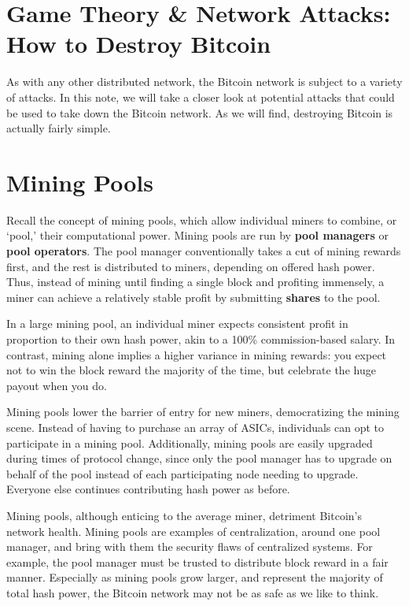\documentclass[full.tex]{subfiles}
\begin{document}
    \thispagestyle{firstpage}
    \vspace*{2\baselineskip}
    \section*{Game Theory \& Network Attacks: How to Destroy Bitcoin}
    
    As with any other distributed network, the Bitcoin network is subject to a variety of attacks. In this note, we will take a closer look at potential attacks that could be used to take down the Bitcoin network. As we will find, destroying Bitcoin is actually fairly simple.
    
    \section*{Mining Pools}
    
    Recall the concept of mining pools, which allow individual miners to combine, or `pool,' their computational power. Mining pools are run by \textbf{pool managers} or \textbf{pool operators}. The pool manager conventionally takes a cut of mining rewards first, and the rest is distributed to miners, depending on offered hash power. Thus, instead of mining until finding a single block and profiting immensely, a miner can achieve a relatively stable profit by submitting \textbf{shares} to the pool. 
    
    In a large mining pool, an individual miner expects consistent profit in proportion to their own hash power, akin to a 100\% commission-based salary. In contrast, mining alone implies a higher variance in mining rewards: you expect not to win the block reward the majority of the time, but celebrate the huge payout when you do. 
    
    Mining pools lower the barrier of entry for new miners, democratizing the mining scene. Instead of having to purchase an array of ASICs, individuals can opt to participate in a mining pool. Additionally, mining pools are easily upgraded during times of protocol change, since only the pool manager has to upgrade on behalf of the pool instead of each participating node needing to upgrade. Everyone else continues contributing hash power as before.
    
    Mining pools, although enticing to the average miner, detriment Bitcoin's network health. Mining pools are examples of centralization, around one pool manager, and bring with them the security flaws of centralized systems. For example, the pool manager must be trusted to distribute block reward in a fair manner. Especially as mining pools grow larger, and represent the majority of total hash power, the Bitcoin network may not be as safe as we like to think.
    
\end{document}
